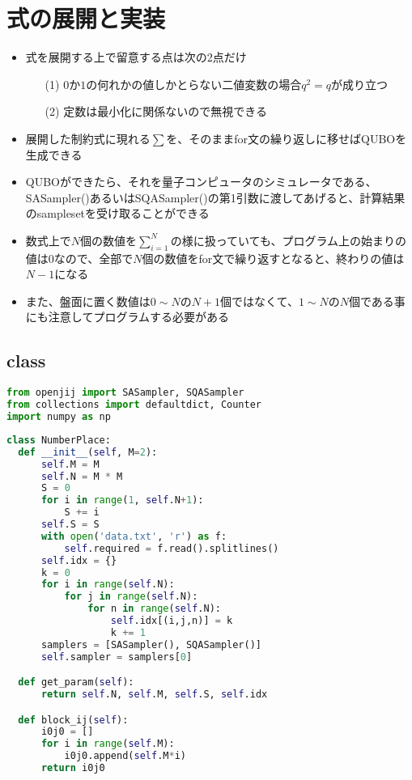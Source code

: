 \documentclass[uplatex,dvipdfmx,a4paper,11pt,oneside,openany]{jsbook}
\begin{document}
\section{式の展開と実装}

\begin{itemize}
\item 式を展開する上で留意する点は次の2点だけ
  \begin{itemize}
  \item[(1)] $0$か$1$の何れかの値しかとらない二値変数の場合$q^2=q$が成り立つ
  \item[(2)] 定数は最小化に関係ないので無視できる
  \end{itemize}
\item 展開した制約式に現れる$\sum$を、そのままfor文の繰り返しに移せばQUBOを生成できる
\item QUBOができたら、それを量子コンピュータのシミュレータである、SASampler()あるいはSQASampler()の第1引数に渡してあげると、計算結果のsamplesetを受け取ることができる
\item 数式上で$N$個の数値を$\sum_{i=1}^N$の様に扱っていても、プログラム上の始まりの値は$0$なので、全部で$N$個の数値をfor文で繰り返すとなると、終わりの値は$N-1$になる
\item また、盤面に置く数値は$0\sim N$の$N+1$個ではなくて、$1\sim N$の$N$個である事にも注意してプログラムする必要がある
\end{itemize}

\subsection{class}

\begin{lstlisting}[language=Python]
from openjij import SASampler, SQASampler
from collections import defaultdict, Counter
import numpy as np
\end{lstlisting}

\begin{lstlisting}[language=Python]
class NumberPlace:
  def __init__(self, M=2):
      self.M = M
      self.N = M * M
      S = 0
      for i in range(1, self.N+1):
          S += i
      self.S = S
      with open('data.txt', 'r') as f:
          self.required = f.read().splitlines()
      self.idx = {}
      k = 0
      for i in range(self.N):
          for j in range(self.N):
              for n in range(self.N):
                  self.idx[(i,j,n)] = k
                  k += 1
      samplers = [SASampler(), SQASampler()]
      self.sampler = samplers[0]

  def get_param(self):
      return self.N, self.M, self.S, self.idx

  def block_ij(self):
      i0j0 = []
      for i in range(self.M):
          i0j0.append(self.M*i)
      return i0j0
\end{lstlisting}
\end{document}
